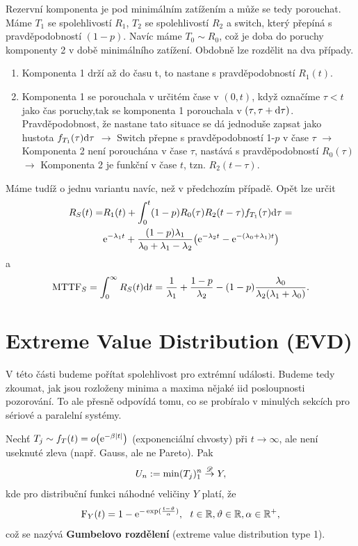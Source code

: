     Rezervní komponenta je pod minimálním zatížením a může se tedy porouchat.  Máme $T_1$ se spolehlivostí $R_1$, $T_2$ se spolehlivostí $R_2$ a switch, který přepíná s pravděpodobností $(1-p)$. Navíc máme $T_0 \sim R_0$, což je doba do poruchy komponenty 2 v době minimálního zatížení. Obdobně lze rozdělit na dva případy.
    \begin{enumerate}
        \item Komponenta 1 drží až do času t, to nastane s pravděpodobností $R_1(t)$.
        \item Komponenta 1 se porouchala v určitém čase v $(0,t)$, když označíme $\tau < t$ jako čas poruchy,tak se komponenta 1 porouchala v $(\tau,\tau + \mathrm{d}\tau)$. Pravděpodobnost, že nastane tato situace se dá jednoduše zapsat jako hustota $f_{T_1}(\tau)\mathrm{d}\tau$ $\longrightarrow$ Switch přepne s pravděpodobností 1-$p$ v čase $\tau$ $\longrightarrow$ Komponenta 2 není porouchána v čase $\tau$, nastává s pravděpodobností $R_0(\tau)$ $\longrightarrow$ Komponenta 2 je funkční v čase $t$, tzn. $R_2(t-\tau)$.
    \end{enumerate}
    
    Máme tudíž o jednu variantu navíc, než v předchozím případě. Opět lze určit 
    \begin{align*}
        R_S(t) = &	R_1(t) + \int_0^t (1-p)R_0(\tau)R_2(t-\tau) f_{T_1}(\tau)\mathrm{d}\tau = \\ &
        \mathrm{e}^{-\lambda_1 t} + \frac{(1-p)\lambda_1}{\lambda_0+\lambda_1-\lambda_2}\big(\mathrm{e}^{-\lambda_2 t} - \mathrm{e}^{-(\lambda_0 + \lambda_1) t} \big)
    \end{align*}
    a
    \begin{align*}
        \mathrm{MTTF}_S = \int_0^{\infty} R_S(t) \mathrm{d} t = \frac{1}{\lambda_1} + \frac{1-p}{\lambda_2} - (1-p)\frac{\lambda_0}{\lambda_2(\lambda_1 + \lambda_0)}.
    \end{align*}
    
\section{Extreme Value Distribution (EVD)}

    V této části budeme pořítat spolehlivost pro extrémní události. Budeme tedy zkoumat, jak jsou rozloženy minima a maxima nějaké iid posloupnosti pozorování. To ale přesně odpovídá tomu, co se probíralo v minulých sekcích pro sériové a paralelní systémy.

    \begin{define}
        Nechť $T_j \sim f_T(t) = o\big(\mathrm{e}^{-\beta\left|t\right|} \big)$ (exponenciální chvosty) při $t \rightarrow \infty$, ale není useknuté zleva (např. Gauss, ale ne Pareto). Pak 
        $$ U_n:=\min(T_j)_1^n  \stackrel{\mathscr{D}}{\to} Y  ,$$ kde
        pro distribuční funkci náhodné veličiny $Y$ platí, že	
        $$ \mathrm{F}_Y(t)  = 1 - \mathrm{e}^{-\exp(\frac{t-\vartheta}{\alpha} )},~~t \in \mathbb{R}, \vartheta \in \mathbb{R}, \alpha \in\mathbb{R}^+,  $$
        což se nazývá \textbf{Gumbelovo rozdělení} (extreme value distribution type 1).
    \end{define}
    
